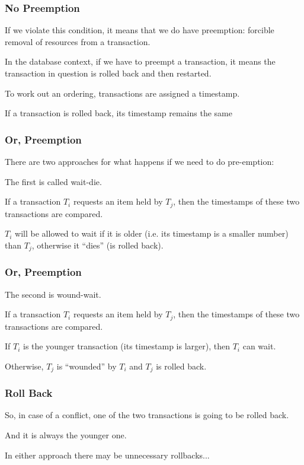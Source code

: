 \begin{frame}
\frametitle{No Preemption}
If we violate this condition, it means that we do have preemption: forcible removal of resources from a transaction.

In the database context, if we have to preempt a transaction, it means the transaction in question is rolled back and then restarted. 

To work out an ordering, transactions are assigned a timestamp. 

If a transaction is rolled back, its timestamp remains the same
\end{frame}


\begin{frame}
\frametitle{Or, Preemption}
There are two approaches for what happens if we need to do pre-emption:

The first is called \alert{wait-die}. 

If a transaction $T_{i}$ requests an item held by $T_{j}$, then the timestamps of these two transactions are compared. 

$T_{i}$ will be allowed to wait if it is older (i.e. its timestamp is a smaller number) than $T_{j}$, otherwise it ``dies'' (is rolled back). 


\end{frame}

\begin{frame}
\frametitle{Or, Preemption}

The second is \alert{wound-wait}. 

If a transaction $T_{i}$ requests an item held by $T_{j}$, then the timestamps of these two transactions are compared. 

If $T_{i}$ is the younger transaction (its timestamp is larger), then $T_{i}$ can wait. 

Otherwise, $T_{j}$ is ``wounded'' by $T_{i}$ and $T_{j}$ is rolled back.

\end{frame}

\begin{frame}
\frametitle{Roll Back}

So, in case of a conflict, one of the two transactions is going to be rolled back. 

And it is always the younger one. 

In either approach there may be unnecessary rollbacks...

\end{frame}

